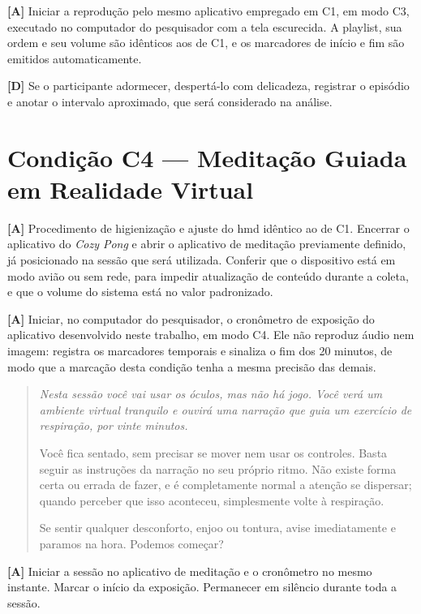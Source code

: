 \noindent\textbf{[A]} Iniciar a reprodução pelo mesmo aplicativo empregado em C1, em modo C3, executado no computador do pesquisador com a tela escurecida. A playlist, sua ordem e seu volume são idênticos aos de C1, e os marcadores de início e fim são emitidos automaticamente.

\noindent\textbf{[D]} Se o participante adormecer, despertá-lo com delicadeza, registrar o episódio e anotar o intervalo aproximado, que será considerado na análise.

\section{Condição C4 --- Meditação Guiada em Realidade Virtual}

\noindent\textbf{[A]} Procedimento de higienização e ajuste do \gls{hmd} idêntico ao de C1. Encerrar o aplicativo do \textit{Cozy Pong} e abrir o aplicativo de meditação previamente definido, já posicionado na sessão que será utilizada. Conferir que o dispositivo está em modo avião ou sem rede, para impedir atualização de conteúdo durante a coleta, e que o volume do sistema está no valor padronizado.

\noindent\textbf{[A]} Iniciar, no computador do pesquisador, o cronômetro de exposição do aplicativo desenvolvido neste trabalho, em modo C4. Ele não reproduz áudio nem imagem: registra os marcadores temporais e sinaliza o fim dos 20 minutos, de modo que a marcação desta condição tenha a mesma precisão das demais.

\begin{quote}\itshape
Nesta sessão você vai usar os óculos, mas não há jogo. Você verá um ambiente virtual tranquilo e ouvirá uma narração que guia um exercício de respiração, por vinte minutos.

Você fica sentado, sem precisar se mover nem usar os controles. Basta seguir as instruções da narração no seu próprio ritmo. Não existe forma certa ou errada de fazer, e é completamente normal a atenção se dispersar; quando perceber que isso aconteceu, simplesmente volte à respiração.

Se sentir qualquer desconforto, enjoo ou tontura, avise imediatamente e paramos na hora. Podemos começar?
\end{quote}

\noindent\textbf{[A]} Iniciar a sessão no aplicativo de meditação e o cronômetro no mesmo instante. Marcar o início da exposição. Permanecer em silêncio durante toda a sessão.


